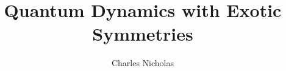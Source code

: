 \documentclass[defaultstyle,11pt,english]{thesis}
\title{Quantum Dynamics with Exotic Symmetries}
\author{Charles Nicholas} %
  {Stahl} %
\begin{document}









\nocite{Carroll2002Alice}


\begin{singlespacing}
\printbibliography[
  title={References},
  heading=bibintoc
]
\end{singlespacing}





\end{document}
